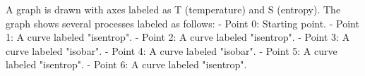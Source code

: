 A graph is drawn with axes labeled as T (temperature) and S (entropy). The graph shows several processes labeled as follows:  
- Point 0: Starting point.  
- Point 1: A curve labeled "isentrop".  
- Point 2: A curve labeled "isentrop".  
- Point 3: A curve labeled "isobar".  
- Point 4: A curve labeled "isobar".  
- Point 5: A curve labeled "isentrop".  
- Point 6: A curve labeled "isentrop".